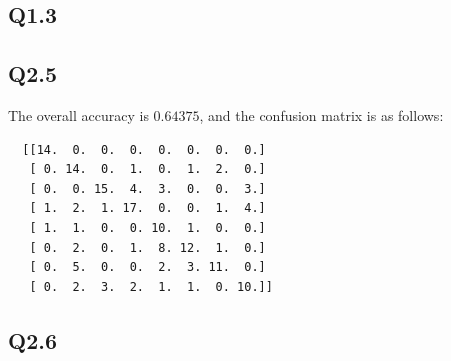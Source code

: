 \documentclass[11pt]{article}
\begin{document}
\newpage

\subsection*{Q1.3}

\newpage

\subsection*{Q2.5}

The overall accuracy is $0.64375$, and the confusion matrix is as follows:

\begin{verbatim}
  [[14.  0.  0.  0.  0.  0.  0.  0.]
   [ 0. 14.  0.  1.  0.  1.  2.  0.]
   [ 0.  0. 15.  4.  3.  0.  0.  3.]
   [ 1.  2.  1. 17.  0.  0.  1.  4.]
   [ 1.  1.  0.  0. 10.  1.  0.  0.]
   [ 0.  2.  0.  1.  8. 12.  1.  0.]
   [ 0.  5.  0.  0.  2.  3. 11.  0.]
   [ 0.  2.  3.  2.  1.  1.  0. 10.]]
\end{verbatim}

\newpage

\subsection*{Q2.6}

\newpage
\end{document}
